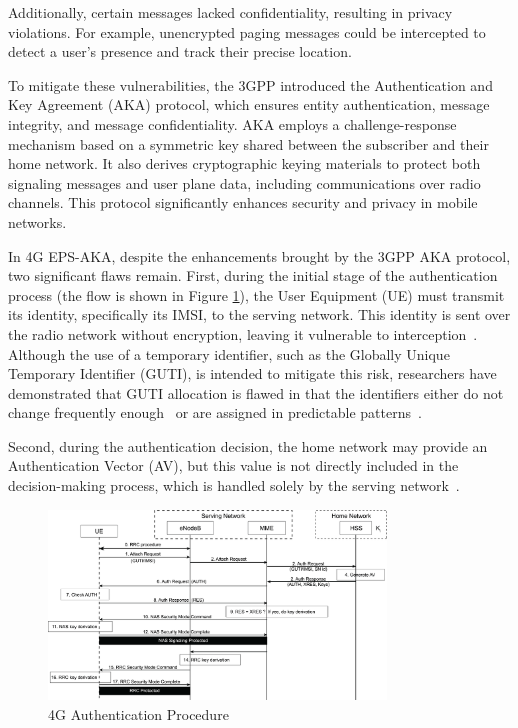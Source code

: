 Additionally, certain messages lacked confidentiality, resulting in privacy violations. For example, unencrypted paging messages could be intercepted to detect a user’s presence and track their precise location. 

To mitigate these vulnerabilities, the 3GPP introduced the Authentication and Key Agreement (AKA) protocol, which ensures entity authentication, message integrity, and message confidentiality. AKA employs a challenge-response mechanism based on a symmetric key shared between the subscriber and their home network. It also derives cryptographic keying materials to protect both signaling messages and user plane data, including communications over radio channels. This protocol significantly enhances security and privacy in mobile networks.

In 4G EPS-AKA, despite the enhancements brought by the 3GPP AKA protocol, two significant flaws remain. First, during the initial stage of the authentication process (the flow is shown in Figure \ref{fig:4g-authentication-flow}), the User Equipment (UE) must transmit its identity, specifically its IMSI, to the serving network. This identity is sent over the radio network without encryption, leaving it vulnerable to interception~\cite{cbl-comp-4g-5g-p3}. Although the use of a temporary identifier, such as the Globally Unique Temporary Identifier (GUTI), is intended to mitigate this risk, researchers have demonstrated that GUTI allocation is flawed in that the identifiers either do not change frequently enough~\cite{gt-freq} or are assigned in predictable patterns~\cite{gt-pred}.

Second, during the authentication decision, the home network may provide an Authentication Vector (AV), but this value is not directly included in the decision-making process, which is handled solely by the serving network~\cite{cbl-comp-4g-5g-p4}.

\begin{figure}[htbp]
    \centering
    \includegraphics[width=0.8\textwidth]{figs/4g-authentication-flow.png}
    \caption{\ac{4G} Authentication Procedure}
    \label{fig:4g-authentication-flow}
\end{figure}

